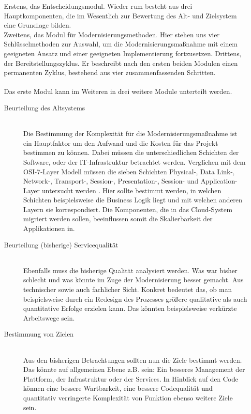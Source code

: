 Erstens, das Entscheidungsmodul. Wieder rum besteht aus drei Hauptkomponenten, die im Wesentlich zur Bewertung des Alt- und Zielsystem eine Grundlage bilden.\\
Zweitens, das Modul für Modernisierungsmethoden. Hier stehen uns vier Schlüsselmethoden zur Auswahl, um die Modernisierungsmaßnahme mit einem geeigneten Ansatz und einer geeigneten Implementierung fortzusetzen.
Drittens, der Bereitstellungszyklus. Er beschreibt nach den ersten beiden Modulen einen permanenten Zyklus, bestehend aus vier zusammenfassenden Schritten.
\\\\
Das erste Modul kann im Weiteren in drei weitere Module unterteilt werden.
\begin{description}   
 \item [Beurteilung des Altsystems] \hfill \\
Die Bestimmung der Komplexität für die Modernisierungsmaßnahme ist ein Hauptfaktor  um den Aufwand und die Kosten für das Projekt bestimmen zu können.  Dabei müssen die unterschiedlichen Schichten der Software, oder der IT-Infrastruktur betrachtet werden. Verglichen mit dem OSI-7-Layer Modell müssen die sieben Schichten Physical-, Data Link-, Network-, Transport-, Session-, Presentation-, Session- und Application-Layer untersucht werden \cite{briscoe2000understanding}.  Hier sollte bestimmt werden, in welchen Schichten beispielsweise die Business Logik liegt und mit welchen anderen Layern sie korrespondiert. Die Komponenten, die in das Cloud-System migriert werden sollen, beeinflussen somit die Skalierbarkeit der Applikationen in. 
 \item [Beurteilung (bisherige) Servicequalität] \hfill \\
Ebenfalls muss die bisherige Qualität analysiert werden. Was war bisher schlecht und was könnte  im Zuge der Modernisierung besser gemacht. Aus technischer sowie auch fachlicher Sicht. Konkret bedeutet das, ob man beispielsweise durch ein Redesign des Prozesses größere qualitative als auch quantitative Erfolge erzielen kann. Das könnten beispielsweise verkürzte Arbeitswege sein.
 \item [Bestimmung von Zielen] \hfill \\
 Aus den bisherigen Betrachtungen sollten nun die Ziele bestimmt werden. Das könnte auf allgemeinen Ebene z.B. sein: Ein besseres Management der Plattform, der Infrastruktur oder der Services. In Hinblick auf den Code können eine bessere Wartbarkeit, eine bessere Codequalität und quantitativ verringerte Komplexität von Funktion ebenso weitere Ziele sein. 
 \end{description}
 
